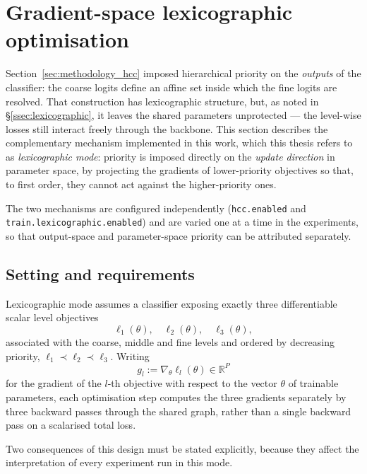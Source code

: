 \section{Gradient-space lexicographic optimisation}
\label{sec:methodology_lex}

Section~\ref{sec:methodology_hcc} imposed hierarchical priority on the \emph{outputs} of the
classifier: the coarse logits define an affine set inside which the fine logits are resolved.
That construction has lexicographic structure, but, as noted in \S\ref{ssec:lexicographic}, it
leaves the shared parameters unprotected --- the level-wise losses still interact freely through
the backbone. This section describes the complementary mechanism implemented in this work, which
this thesis refers to as \emph{lexicographic mode}: priority is imposed directly on the
\emph{update direction} in parameter space, by projecting the gradients of lower-priority
objectives so that, to first order, they cannot act against the higher-priority ones.

The two mechanisms are configured independently (\texttt{hcc.enabled} and
\texttt{train.lexicographic.enabled}) and are varied one at a time in the experiments, so that
output-space and parameter-space priority can be attributed separately.

\subsection{Setting and requirements}
\label{ssec:lex_setting}

Lexicographic mode assumes a classifier exposing exactly three differentiable scalar level
objectives
\[
\ell_1(\theta),\quad \ell_2(\theta),\quad \ell_3(\theta),
\]
associated with the coarse, middle and fine levels and ordered by decreasing priority,
$\ell_1 \prec \ell_2 \prec \ell_3$. Writing
\[
g_l := \nabla_\theta \ell_l(\theta) \in \mathbb{R}^{P}
\]
for the gradient of the $l$-th objective with respect to the vector $\theta$ of trainable
parameters, each optimisation step computes the three gradients separately by three backward
passes through the shared graph, rather than a single backward pass on a scalarised total loss.

Two consequences of this design must be stated explicitly, because they affect the
interpretation of every experiment run in this mode.

